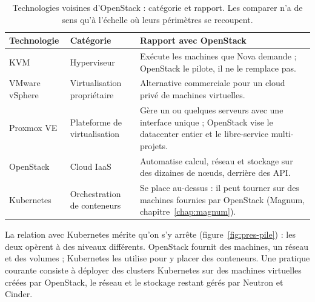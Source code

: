 \begin{table}[!ht]
\centering
\renewcommand{\arraystretch}{1.25}
\begin{tabular}{@{}>{\raggedright\arraybackslash}p{2.6cm}>{\raggedright\arraybackslash}p{3.4cm}>{\raggedright\arraybackslash}p{9.5cm}@{}}
\toprule
\textbf{Technologie} & \textbf{Catégorie} & \textbf{Rapport avec OpenStack} \\
\midrule
KVM & Hyperviseur & Exécute les machines que Nova demande ; OpenStack le pilote, il ne le remplace pas. \\
VMware vSphere & Virtualisation propriétaire & Alternative commerciale pour un cloud privé de machines virtuelles. \\
Proxmox VE & Plateforme de virtualisation & Gère un ou quelques serveurs avec une interface unique ; OpenStack vise le datacenter entier et
  le libre-service multi-projets. \\
OpenStack & Cloud IaaS & Automatise calcul, réseau et stockage sur des dizaines de nœuds, derrière des API. \\
Kubernetes & Orchestration de conteneurs & Se place au-dessus : il peut tourner sur des machines fournies par OpenStack (Magnum, chapitre~\ref{chap:magnum}). \\
\bottomrule
\end{tabular}
\caption{Technologies voisines d'OpenStack : catégorie et rapport. Les comparer n'a de sens qu'à l'échelle où leurs périmètres se
recoupent.}
\label{tab:pres-compar}
\end{table}

La relation avec Kubernetes mérite qu'on s'y arrête (figure~\ref{fig:pres-pile}) : les deux opèrent à des niveaux différents. OpenStack
fournit des machines, un réseau et des volumes ; Kubernetes les utilise pour y placer des conteneurs. Une pratique courante consiste à
déployer des clusters Kubernetes sur des machines virtuelles créées par OpenStack, le réseau et le stockage restant gérés par Neutron et
Cinder.

